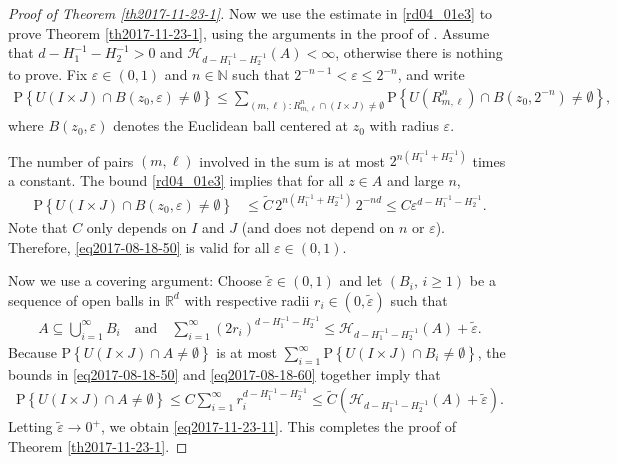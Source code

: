 \documentclass[12pt,a4paper]{article}
\newcommand {\ep}{{\varepsilon}}
\newcommand{\<}{\langle}
\renewcommand{\>}{\rangle}
\begin{document}
\begin{proof}[Proof of Theorem \ref{th2017-11-23-1}]
Now we use the estimate in \eqref{rd04_01e3} to prove Theorem \ref{th2017-11-23-1}, using the arguments in the proof of  \cite[Theorem 3.1]{DKN07}. Assume that $d - H_1^{-1} - H_2^{-1} > 0$ and $\mathscr{H}_{d - H_1^{-1} - H_2^{-1}}(A) < \infty$, otherwise there is nothing to prove.
Fix $\ep \in (0, 1)$ and $n \in \mathbb{N}$ such that $2^{-n - 1} < \ep \leq 2^{-n}$, and write
\begin{align*}
\mbox{P}\left\{U(I \times J) \cap B(z_0, \ep) \neq \emptyset \right\} \leq \sum_{(m, \ell): R_{m, \ell}^n \cap (I \times J) \neq \emptyset}\mbox{P}\left\{U(R_{m, \ell}^n) \cap B(z_0, 2^{-n}) \neq \emptyset \right\},
\end{align*}
where $B(z_0, \ep)$ denotes the Euclidean ball centered at $z_0$ with radius $\ep$.

 The number of pairs $(m, \ell)$ involved in the sum is at most $2^{n(H_1^{-1} + H_2^{-1})}$ times a constant. The bound \eqref{rd04_01e3} implies that for all $z \in A$ and large $n$,
\begin{align}\label{eq2017-08-18-50}
\mbox{P}\left\{U(I \times J) \cap B(z_0, \ep) \neq \emptyset \right\} &\leq \tilde{C}\, 2^{n(H_1^{-1} + H_2^{-1})} \, 2^{-nd}
 \leq C \ep^{d - H_1^{-1} - H_2^{-1}}.
\end{align}
Note that $C$ only depends on $I$ and $J$ (and does not depend on $n$ or $\ep$). Therefore, \eqref{eq2017-08-18-50} is valid for all $\ep \in (0, 1)$.


Now we use a covering argument: Choose $\tilde{\ep} \in (0, 1)$ and let $(B_i,\, i \geq 1)$ be a sequence of open balls in $\mathbb{R}^d$ with respective radii $r_i \in (0, \tilde{\ep})$ such that
\begin{align}\label{eq2017-08-18-60}
A \subseteq \bigcup_{i = 1}^{\infty}B_i \quad \mbox{and} \quad \sum_{i = 1}^{\infty}(2r_i)^{d - H_1^{-1} - H_2^{-1}} \leq \mathscr{H}_{d - H_1^{-1} - H_2^{-1}}(A) + \tilde{\ep}.
\end{align}
Because $\mbox{P}\left\{U(I \times J) \cap A \neq \emptyset \right\}$ is at most $\sum_{i = 1}^{\infty}\mbox{P}\left\{U(I \times J) \cap B_i \neq \emptyset \right\}$, the bounds in \eqref{eq2017-08-18-50} and \eqref{eq2017-08-18-60} together imply that
\begin{align*}%
\mbox{P}\left\{U(I \times J) \cap A \neq \emptyset \right\} \leq C \sum_{i = 1}^{\infty} r_i^{d - H_1^{-1} - H_2^{-1}} \leq \tilde C \left(\mathscr{H}_{d - H_1^{-1} - H_2^{-1}}(A) + \tilde{\ep}\right).
\end{align*}
Letting $\tilde{\ep} \rightarrow 0^{+}$, we obtain \eqref{eq2017-11-23-11}. This completes the proof of Theorem \ref{th2017-11-23-1}.
\end{proof}
\end{document}
